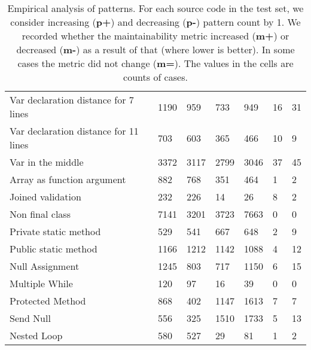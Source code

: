 \begin{table}[ht]
\begin{tabular}{lllllll}
Var declaration distance for 7 lines   		&	1190	&	959	&	733	&	949	&	16	&	31	\\
Var declaration distance for 11 lines  		&	703	&	603	&	365	&	466	&	10	&	9	\\
Var in the middle                      		&	3372	&	3117	&	2799	&	3046	&	37	&	45	\\
Array as function argument             		&	882	&	768	&	351	&	464	&	1	&	2	\\
Joined validation                      		&	232	&	226	&	14	&	26	&	8	&	2	\\
Non final class                        		&	7141	&	3201	&	3723	&	7663	&	0	&	0	\\
Private static method                  		&	529	&	541	&	667	&	648	&	2	&	9	\\
Public static method                   		&	1166	&	1212	&	1142	&	1088	&	4	&	12	\\
Null Assignment                        		&	1245	&	803	&	717	&	1150	&	6	&	15	\\
Multiple While                         		&	120	&	97	&	16	&	39	&	0	&	0	\\
Protected Method                       		&	868	&	402	&	1147	&	1613	&	7	&	7	\\
Send Null                              		&	556	&	325	&	1510	&	1733	&	5	&	13	\\
Nested Loop                            		&	580	&	527	&	29	&	81	&	1	&	2	\\
\hline
\end{tabular}
\centering
\caption{Empirical analysis of patterns. For each source code in the test set, we consider increasing (\textbf{p+}) and decreasing (\textbf{p-}) pattern count by 1. We recorded whether the maintainability metric increased (\textbf{m+}) or decreased (\textbf{m-}) as a result of that (where lower is better). In some cases the metric did not change (\textbf{m=}). The values in the cells are counts of cases.}
\label{tab:pattern_analysis}
\captionsetup{font=scriptsize}

\end{table}
